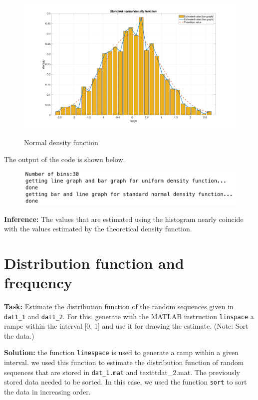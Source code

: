 \begin{figure}[H]
\centering
{\includegraphics[scale=0.12]{ass2_2.png}}
\caption{Normal density function}
\label{Normal density function}
\end{figure}

\noindent The output of the code is shown below.
\begin{figure}[H]
\centering
{\includegraphics[scale=0.58]{ass2_3.png}}
\end{figure}

\noindent \textbf{Inference:} The values that are estimated using the histogram nearly coincide with the values estimated by the theoretical density function.


\section{ Distribution function and frequency  } \label{ Distribution function and frequency }
\noindent \textbf{Task:} Estimate the distribution function of the random sequences given in \texttt{dat1\_1} and \texttt{dat1\_2}. For this, generate with the MATLAB instruction \texttt{linspace} a rampe within the interval [0, 1] and use it for drawing the estimate. (Note: Sort the data.) 

\noindent \textbf{Solution:} the function \texttt{linespace} is used to generate a ramp within a given interval. we used this function to estimate the distribution function of random sequences that are stored in \texttt{dat\_1.mat} and texttt{dat\_2.mat}. The previously stored data needed to be sorted. In this case, we used the function \texttt{sort} to sort the data in increasing order.

